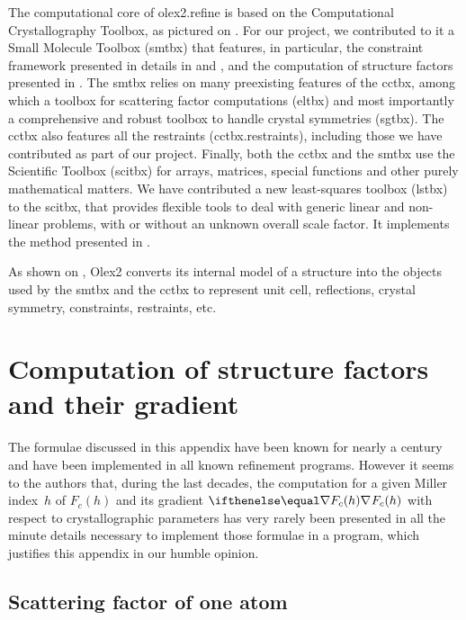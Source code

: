 \documentclass[pdf]{iucr}
\begin{document}
The computational core of olex2.refine is based on the Computational Crystallography Toolbox, as pictured on . For our project, we contributed to it a Small Molecule Toolbox (smtbx) that features, in particular, the constraint framework presented in details in  and , and the computation of structure factors presented in . The smtbx relies on many preexisting features of the cctbx, among which a toolbox for scattering factor computations (eltbx) and most importantly a comprehensive and robust toolbox to handle crystal symmetries (sgtbx). The cctbx also features all the restraints (cctbx.restraints), including those we have contributed as part of our project. Finally, both the cctbx and the smtbx use the Scientific Toolbox (scitbx) for arrays, matrices, special functions and other purely mathematical matters. We have contributed a new least-squares toolbox (lstbx) to the scitbx, that provides flexible tools to deal with generic linear and non-linear problems, with or without an unknown overall scale factor. It implements the method presented in .

As shown on , Olex2 converts its internal model of a structure into the objects used by the smtbx and the cctbx to represent unit cell, reflections, crystal symmetry, constraints, restraints, etc. 


\section{Computation of structure factors and their gradient}
\label{appendix:structurefactorlinearisation}

The formulae discussed in this appendix have been known for nearly a century and have been implemented in all known refinement programs. However it seems to the authors that, during the last decades, the computation for a given Miller index~$h$ of $F_c(h)$ and its gradient $\grad{F_c(h)}$ with respect to crystallographic parameters has very rarely been presented in all the minute details necessary to implement those formulae in a program, which justifies this appendix in our humble opinion.

\subsection{Scattering factor of one atom}
\end{document}
